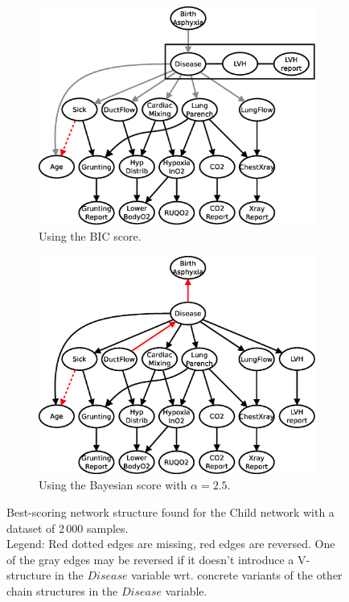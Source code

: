 \documentclass[english,cover]{fitthesis} %
\begin{document}
\begin{figure}[ht]
    \centering
    \begin{subfigure}[b]{0.45\linewidth}
        \hspace{-1.3cm}
        \includegraphics[scale=0.35]{fig/structure-learning-child-2000-bic}
        \caption{Using the BIC score.}
        \label{fig:structure-learning-child-2000-bic}
    \end{subfigure}
    \begin{subfigure}[b]{0.45\linewidth}
        \hspace{-0.4cm}
        \includegraphics[scale=0.35]{fig/structure-learning-child-2000-bayes-2_5}
        \caption{Using the Bayesian score with $\alpha = 2.5$.}
        \label{fig:structure-learning-child-2000-bayes-2_5}
    \end{subfigure}
    \caption{Best-scoring network structure found for the Child network with a dataset of 2\,000 samples.
    \\Legend: Red dotted edges are missing, red edges are reversed. One of the gray edges may be reversed if it doesn't introduce a V-structure in the $Disease$ variable wrt. concrete variants of the other chain structures in the $Disease$ variable.}
\end{figure}
\end{document}

